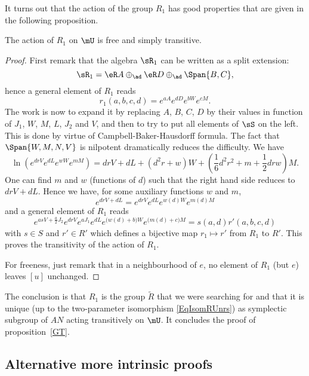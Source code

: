 It turns out that the action of the group $R_1$ has good properties that are given in the following proposition.
\begin{proposition}
	The action of $R_1$ on $\mU$ is free and simply transitive.
	\label{PropCRunXXX}
\end{proposition}

\begin{proof}

	First remark that the algebra $\sR_1$ can be written as a split extension:
	\[
		\sR_1=\eR A\oplus_{\ad} \eR D\oplus_{\ad}\Span\{ B,C \},
	\]
	hence a general element of $R_1$ reads
	\begin{equation}
		r_1(a,b,c,d)= e^{aA} e^{dD} e^{bW} e^{cM}.
	\end{equation}
	The work is now to expand it by replacing $A$, $B$, $C$, $D$ by their values in function of $J_1$, $W$, $M$, $L$, $J_2$ and $V$, and then to try to put all elements of $\sS$ on the left. This is done by virtue of Campbell-Baker-Hausdorff formula. The fact that $\Span\{ W,M,N,V \}$ is nilpotent dramatically reduces the difficulty. We have
	\[
		\ln( e^{drV} e^{dL} e^{wW} e^{mM})= drV+dL+(d^{2}r+w)W+(\frac{1}{ 6 }d^{2}r^{2}+m+\frac{ 1 }{2}drw)M.
	\]
	One can find $m$ and $w$ (functions of $d$) such that the right hand side reduces to $drV+dL$. Hence we have, for some auxiliary functions $w$ and $m$,
	\[
		e^{drV+dL}= e^{drV} e^{dL} e^{w(d)W} e^{m(d)M}
	\]
	and a general element of $R_1$ reads
	\begin{equation}
		e^{asV+\frac{ a }{2}J_2} e^{drV} e^{aJ_1} e^{dL} e^{\big( w(d)+b \big)W} e^{\big( m(d)+c \big)M}=s(a,d)r'(a,b,c,d)
	\end{equation}
	with $s\in S$ and $r'\in R'$ which defines a bijective map $r_1\mapsto r'$ from $R_1$ to $R'$. This proves the transitivity of the action of $R_1$.

	For freeness, just remark that in a neighbourhood of $e$, no element of $R_1$ (but $e$) leaves $[u]$ unchanged.
\end{proof}

The conclusion is that $R_1$ is the group $\tilde{R}$ that we were searching for and that it is unique (up to the two-parameter isomorphism \eqref{EqIsomRUnrs}) as symplectic subgroup of $AN$ acting transitively on $\mU$. It concludes the proof of proposition~\ref{GT}.

\subsection{Alternative more intrinsic proofs}      \label{subSecAltreintr}


